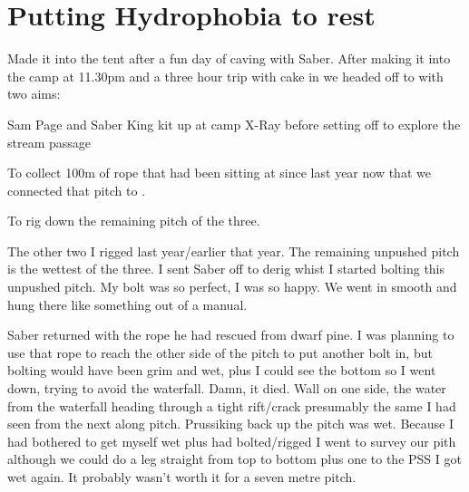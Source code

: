 \section{Putting Hydrophobia to rest}

Made it into the tent after a fun day of caving with Saber. After making it into the camp at 11.30pm and a three hour trip with cake in  we headed off to   with two aims: 

\begin{marginfigure}
\centering
\vspace{100pt}
\label{sam toothbrush}
\caption{Sam Page and Saber King kit up at camp X-Ray before setting off to explore the \protect{} stream passage }
\end{marginfigure}


\begin{citemize} 
 \item To collect 100m of rope that had been sitting at  since last year now that we connected that pitch to .  
 \item To rig down the remaining  pitch of the three. 
 \end{citemize}
 
 The other two I rigged last year/earlier that year.  The remaining unpushed pitch is the wettest of the three. I sent Saber off to derig  whist I started bolting this unpushed pitch. My bolt was so perfect, I was so happy. We went in smooth and hung there like something out of a manual. 

Saber returned with the rope he had rescued from dwarf pine.  I was planning to use that rope to reach the other side of the pitch  to put another bolt in, but bolting would have been grim and wet, plus I could see the bottom so I went down, trying to avoid the waterfall. Damn, it died. Wall on one side, the water from the waterfall heading through a tight rift/crack presumably the same I had seen from the next along pitch. Prussiking back up the pitch was wet. Because I had bothered to get myself wet plus had bolted/rigged I went to survey our pith although we could do a leg straight from top to bottom plus one to the  PSS I got wet again. It probably wasn't worth it for a seven metre pitch.


